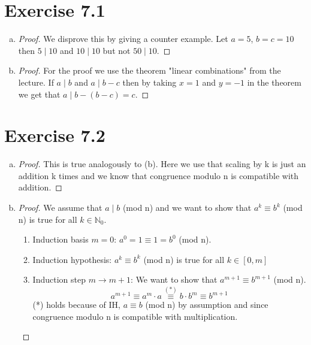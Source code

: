 \documentclass{article} %
\newcommand{\homeworkNumber}{7}
\begin{document}
\section*{Exercise \homeworkNumber.1}

\begin{enumerate}[(a)]
\item \begin{proof}
We disprove this by giving a counter example. Let $a = 5$, $b = c = 10$ then $5 \mid 10$ and $10 \mid 10$ but not $50 \mid 10$.

\end{proof}

\item \begin{proof}
For the proof we use the theorem "linear combinations" from the lecture. If $a \mid b$ and $a \mid b-c$ then by taking $x = 1$ and $y = -1$ in the theorem we get that $a \mid b - (b-c) = c$.

\end{proof}

\end{enumerate}

\section*{Exercise \homeworkNumber.2}

\begin{enumerate}[(a)]
\item \begin{proof}
This is true analogously to (b). Here we use that scaling by k is just an addition k times and we know that congruence modulo n is compatible with addition.
\end{proof}
\item \begin{proof} We assume that $a \mid b$ (mod n) and we want to show that $a^k \equiv b^k$ (mod n) is true for all $k \in \mathbb{N}_{0}$.

\begin{enumerate}[-]
\item Induction basis $m = 0$: $a^0 = 1 \equiv 1 = b^0$ (mod n).
\item Induction hypothesis: $a^k \equiv b^k$ (mod n) is true for all $k \in [0,m]$
\item Induction step $m \rightarrow m + 1$: We want to show that $a^{m+1} \equiv b^{m+1}$ (mod n).
\[
a^{m+1} \equiv a^m \cdot a \stackrel{(*)}{\equiv} b \cdot b^m \equiv b^{m+1}
\]
(*) holds because of IH, $a \equiv b$ (mod n) by assumption and since congruence modulo n is compatible with multiplication.
\end{enumerate}

\end{proof}
\end{enumerate}
\end{document}
